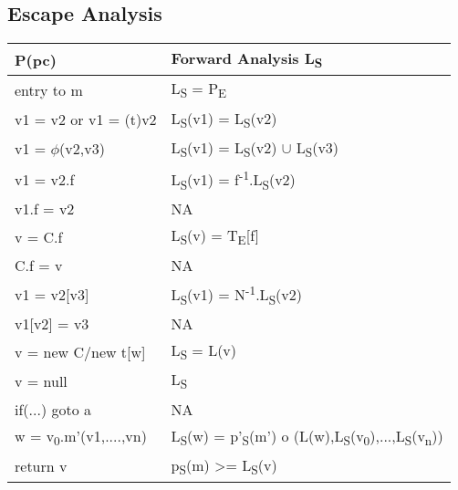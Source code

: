 \documentclass[peerreview]{IEEEtran}
\begin{document}
\subsection{Escape Analysis}
\begin{table}
\centering
\begin{tabular}{| p{3cm} | p{5cm} |}
\hline
P(pc) & Forward Analysis L\textsubscript{S} \\
\hline
entry to m & L\textsubscript{S} = P\textsubscript{E} \\ 
v1 = v2 or v1 = (t)v2 & L\textsubscript{S}(v1) = L\textsubscript{S}(v2) \\
v1 = $\phi$(v2,v3) & L\textsubscript{S}(v1) = L\textsubscript{S}(v2) $\cup$ L\textsubscript{S}(v3) \\
v1 = v2.f & L\textsubscript{S}(v1) = f\textsuperscript{-1}.L\textsubscript{S}(v2) \\
v1.f = v2 & NA \\
v = C.f & L\textsubscript{S}(v) = T\textsubscript{E}[f] \\
C.f = v & NA \\
v1 = v2[v3] & L\textsubscript{S}(v1) = N\textsuperscript{-1}.L\textsubscript{S}(v2) \\
v1[v2] = v3 & NA \\
v = new C/new t[w] & L\textsubscript{S} = L(v) \\
v = null & L\textsubscript{S} \\
if(...) goto a & NA \\
w = v\textsubscript{0}.m'(v1,....,vn) & L\textsubscript{S}(w) = p'\textsubscript{S}(m') o (L(w),L\textsubscript{S}(v\textsubscript{0}),...,L\textsubscript{S}(v\textsubscript{n})) \\
return v & p\textsubscript{S}(m) >= L\textsubscript{S}(v) \\
\hline
\end{tabular}
\end{table}
\end{document}
